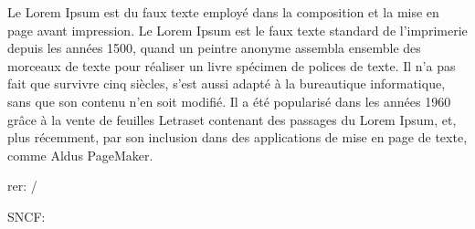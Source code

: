 \documentclass{article}
\begin{document}
\renewcommand{\showlemma}[1]{\emph{#1}}
\beginnumbering
\pstart
Le Lorem Ipsum est  du faux texte employé dans la  composition et la mise en page avant impression. Le Lorem Ipsum est le faux texte standard de l'imprimerie depuis les années 1500, quand un peintre anonyme assembla ensemble des morceaux de texte pour réaliser un livre spécimen de polices de texte. Il n'a pas fait que survivre cinq siècles,  s'est aussi adapté à la bureautique informatique, sans que son contenu n'en soit modifié. Il a été popularisé dans les années 1960 grâce à la vente de feuilles Letraset contenant des passages du Lorem Ipsum, et, plus récemment, par son inclusion dans des applications de mise en page de texte, comme Aldus PageMaker.
\pend
\endnumbering


rer: / 

SNCF:%

\end{document}
